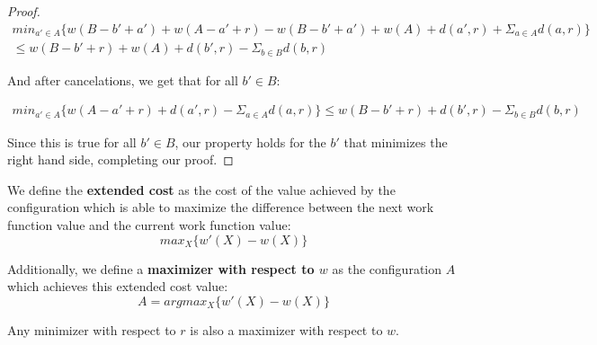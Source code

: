 \begin{proof}
    \begin{equation*}
        \begin{gathered}
            min_{a' \in A} \{ w(B - b' + a') + w(A -a' + r) - w(B - b' + a') + w(A) + d(a', r) + \Sigma_{a \in A} d(a, r)\} \\
            \leq w(B - b' + r) + w(A) + d(b' ,r) - \Sigma_{b \in B} d(b, r)
        \end{gathered}
    \end{equation*}

    And after cancelations, we get that for all $b' \in B$:

    \begin{equation*}
        \begin{gathered}
            min_{a' \in A} \{ w(A - a' + r) + d(a', r) - \Sigma_{a \in A} d(a,r)\} \leq w(B - b' + r) + d(b', r) - \Sigma_{b \in B} d(b,r)
        \end{gathered}
    \end{equation*}

    Since this is true for all $b' \in B$, our property holds for the $b'$ that minimizes the right hand side, completing our proof.
\end{proof}

\begin{definition}
    We define the \textbf{extended cost} as the cost of the value achieved by the configuration which is able to maximize the difference between the next work function value and the current work function value:
    \begin{equation*}
        max_X \{ w'(X) - w(X)\}
    \end{equation*}
\end{definition}

\begin{definition}
    Additionally, we define a \textbf{maximizer with respect to $w$} as the configuration $A$ which achieves this extended cost value:
    \begin{equation*}
        A = argmax_X \{ w'(X) - w(X) \}
    \end{equation*}
\end{definition}

\begin{lemma}
    \label{lem:dual}
    Any minimizer with respect to $r$ is also a maximizer with respect to $w$.
\end{lemma}

